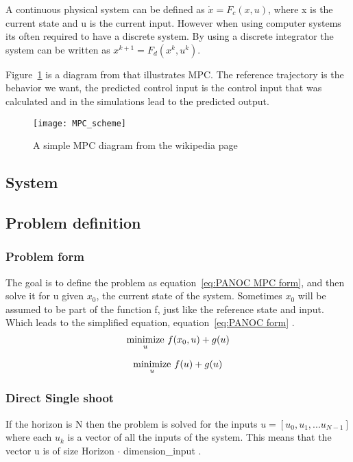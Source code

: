 	A continuous physical system can be defined as $\dot{x}=F_c(x,u)$, where x is the current state and u is the current input. However when using computer systems its often required to have a discrete system. By using a discrete integrator the system can be written as $x^{k+1}=F_d(x^{k},u^{k})$. 
	
	Figure~\ref{fig:MPC diagram} is a diagram from \cite{Wikipedia} that illustrates MPC. The reference trajectory is the behavior we want, the predicted control input is the control input that was calculated and in the simulations lead to the predicted output.
	\begin{figure}[h]
		\centering
		\texttt{[image: MPC\_scheme]}
		\caption{A simple MPC diagram from the wikipedia page \cite{Wikipedia}}
		\label{fig:MPC diagram}
	\end{figure}
			
	\subsection{System}
		
	\subsection{Problem definition}
		\subsubsection{Problem form}
			The goal is to define the problem as equation~\ref{eq:PANOC MPC form}, and then solve it for u given $x_0$, the current state of the system. Sometimes $x_0$ will be assumed to be part of the function f, just like the reference state and input. Which leads to the simplified equation, equation~\ref{eq:PANOC form} .
			\begin{equation}
				\underset{u}{\operatorname*{minimize}} \  f(x_0,u) + g(u)
				\label{eq:PANOC MPC form}
			\end{equation}
			
			\begin{equation}
				\underset{u}{\operatorname*{minimize}} \  f(u) + g(u)
				\label{eq:PANOC form}
			\end{equation}
		\subsubsection{Direct Single shoot}
			If the horizon is N then the problem is solved for the inputs $u=[u_0,u_1,... u_{N-1}]$ where each $u_k$ is a vector of all the inputs of the system. This means that the vector u is of size Horizon $\cdot$ dimension\_input .
			
